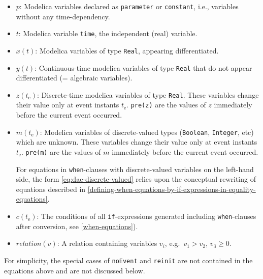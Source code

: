 \begin{itemize}
\item
  $p$:
  Modelica variables declared as \lstinline!parameter! or \lstinline!constant!, i.e., variables without any time-dependency.

\item
  $t$:
  Modelica variable \lstinline!time!, the independent (real) variable.

\item
  $x(t)$:
  Modelica variables of type \lstinline!Real!, appearing differentiated.

\item
  $y(t)$:
  Continuous-time modelica variables of type \lstinline!Real! that do not appear differentiated (= algebraic variables).

\item
  $z(t_{\mathrm{e}})$:
  Discrete-time modelica variables of type \lstinline!Real!.
  These variables change their value only at event instants $t_{\mathrm{e}}$.
  \lstinline!pre(z)! are the values of $z$ immediately before the current event occurred.

\item
  $m(t_{\mathrm{e}})$:
  Modelica variables of discrete-valued types (\lstinline!Boolean!, \lstinline!Integer!, etc) which are unknown.
  These variables change their value only at event instants $t_{\mathrm{e}}$.
  \lstinline!pre(m)! are the values of $m$ immediately before the current event occurred.

  \begin{nonnormative}
    For equations in \lstinline!when!-clauses with discrete-valued variables on the left-hand side, the form \eqref{eq:dae-discrete-valued} relies upon the conceptual rewriting of equations described in \cref{defining-when-equations-by-if-expressions-in-equality-equations}.
  \end{nonnormative}

\item
  $c(t_{\mathrm{e}})$:
  The conditions of all \lstinline!if!-expressions generated including \lstinline!when!-clauses after conversion, see \cref{when-equations}).

\item
  $\mathit{relation}(v)$:
  A relation containing variables $v_{i}$, e.g.\ $v_{1} > v_{2}$, $v_{3} \geq 0$.
\end{itemize}

For simplicity, the special cases of \lstinline!noEvent! and \lstinline!reinit! are not contained in the equations above and are not discussed below.

